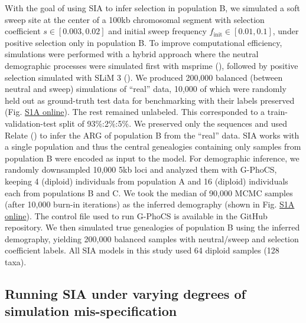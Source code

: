 With the goal of using \ac{SIA} to infer selection in population B, we simulated a soft sweep site at the center of a 100kb chromosomal segment with selection coefficient $s\in [0.003, 0.02]$ and initial sweep frequency $f_{\mathrm{init}} \in [0.01, 0.1]$, under positive selection only in population B. To improve computational efficiency, simulations were performed with a hybrid approach where the neutral demographic processes were simulated first with msprime (\cite{baumdicker_efficient_2022}), followed by positive selection simulated with SLiM 3 (\cite{haller_slim_2019,haller_tree-sequence_2019}). We produced 200,000 balanced (between neutral and sweep) simulations of “real” data, 10,000 of which were randomly held out as ground-truth test data for benchmarking with their labels preserved (Fig. \href{https://journals.plos.org/plosgenetics/article?id=10.1371/journal.pgen.1011032#sec018}{S1A online}). The rest remained unlabeled. This corresponded to a train-validation-test split of 93\%:2\%:5\%. We preserved only the sequences and used Relate (\cite{speidel_method_2019}) to infer the \ac{ARG} of population B from the “real” data. \ac{SIA} works with a single population and thus the central genealogies containing only samples from population B were encoded as input to the model. For demographic inference, we randomly downsampled 10,000 5kb loci and analyzed them with G-PhoCS, keeping 4 (diploid) individuals from population A and 16 (diploid) individuals each from populations B and C. We took the median of 90,000 \acs{MCMC} samples (after 10,000 burn-in iterations) as the inferred demography (shown in Fig. \href{https://journals.plos.org/plosgenetics/article?id=10.1371/journal.pgen.1011032#sec018}{S1A online}). The control file used to run G-PhoCS is available in the GitHub repository. We then simulated true genealogies of population B using the inferred demography, yielding 200,000 balanced samples with neutral/sweep and selection coefficient labels. All \ac{SIA} models in this study used 64 diploid samples (128 taxa).

\subsection{Running \ac{SIA} under varying degrees of simulation mis-specification}

